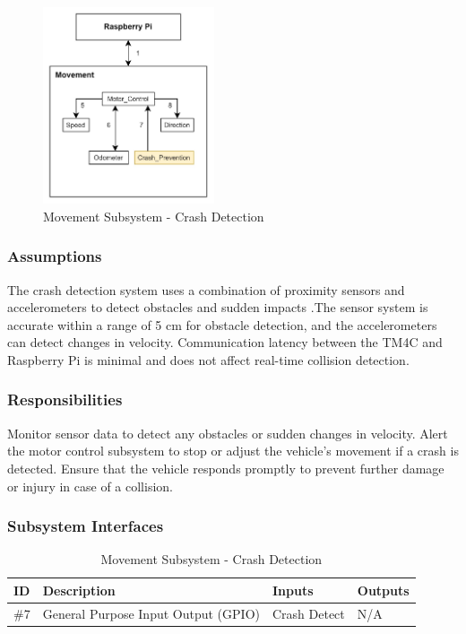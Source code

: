 \begin{figure}[h!]
	\centering
 	\includegraphics[width=0.45\textwidth]{images/movement/crash_prevention.jpg}
 \caption{Movement Subsystem - Crash Detection} %
\end{figure}

\subsubsection{Assumptions}
The crash detection system uses a combination of proximity sensors and accelerometers to detect obstacles and sudden impacts \cite{Hassan2012}.The sensor system is accurate within a range of 5 cm for obstacle detection, and the accelerometers can detect changes in velocity. Communication latency between the TM4C and Raspberry Pi is minimal and does not affect real-time collision detection.

\subsubsection{Responsibilities}
Monitor sensor data to detect any obstacles or sudden changes in velocity. Alert the motor control subsystem to stop or adjust the vehicle's movement if a crash is detected. Ensure that the vehicle responds promptly to prevent further damage or injury in case of a collision.

\subsubsection{Subsystem Interfaces}

\begin {table}[H]
\caption {Movement Subsystem - Crash Detection} 
\begin{center}
    \begin{tabular}{ | p{1cm} | p{6cm} | p{3cm} | p{3cm} |}
    \hline
    ID & Description & Inputs & Outputs \\ \hline
    \#7 & General Purpose Input Output (GPIO) & Crash Detect & N/A \\ \hline
    \end{tabular}
\end{center}
\end{table}

\newpage

